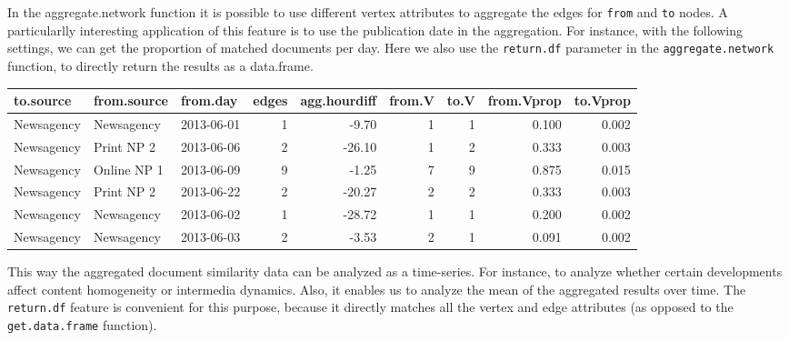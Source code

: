 \documentclass[]{article}
\newenvironment{Shaded}{\begin{snugshade}}{\end{snugshade}}
\newcommand{\KeywordTok}[1]{\textcolor[rgb]{0.13,0.29,0.53}{\textbf{{#1}}}}
\newcommand{\DataTypeTok}[1]{\textcolor[rgb]{0.13,0.29,0.53}{{#1}}}
\newcommand{\StringTok}[1]{\textcolor[rgb]{0.31,0.60,0.02}{{#1}}}
\newcommand{\NormalTok}[1]{{#1}}
\begin{document}
In the aggregate.network function it is possible to use different vertex
attributes to aggregate the edges for \texttt{from} and \texttt{to}
nodes. A particularlly interesting application of this feature is to use
the publication date in the aggregation. For instance, with the
following settings, we can get the proportion of matched documents per
day. Here we also use the \texttt{return.df} parameter in the
\texttt{aggregate.network} function, to directly return the results as a
data.frame.

\begin{Shaded}
\end{Shaded}

\begin{longtable}[c]{@{}lllrrrrrr@{}}
\toprule
to.source & from.source & from.day & edges & agg.hourdiff & from.V &
to.V & from.Vprop & to.Vprop\tabularnewline
\midrule
\endhead
Newsagency & Newsagency & 2013-06-01 & 1 & -9.70 & 1 & 1 & 0.100 &
0.002\tabularnewline
Newsagency & Print NP 2 & 2013-06-06 & 2 & -26.10 & 1 & 2 & 0.333 &
0.003\tabularnewline
Newsagency & Online NP 1 & 2013-06-09 & 9 & -1.25 & 7 & 9 & 0.875 &
0.015\tabularnewline
Newsagency & Print NP 2 & 2013-06-22 & 2 & -20.27 & 2 & 2 & 0.333 &
0.003\tabularnewline
Newsagency & Newsagency & 2013-06-02 & 1 & -28.72 & 1 & 1 & 0.200 &
0.002\tabularnewline
Newsagency & Newsagency & 2013-06-03 & 2 & -3.53 & 2 & 1 & 0.091 &
0.002\tabularnewline
\bottomrule
\end{longtable}

This way the aggregated document similarity data can be analyzed as a
time-series. For instance, to analyze whether certain developments
affect content homogeneity or intermedia dynamics. Also, it enables us
to analyze the mean of the aggregated results over time. The
\texttt{return.df} feature is convenient for this purpose, because it
directly matches all the vertex and edge attributes (as opposed to the
\texttt{get.data.frame} function).
\end{document}
